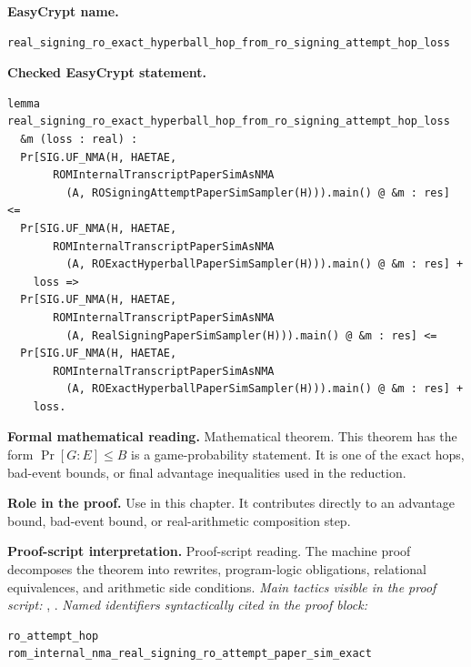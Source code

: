 \begin{formaltheorem}
\noindent\textbf{EasyCrypt name.}
\begin{lstlisting}[language=EasyCrypt,basicstyle=\ttfamily\scriptsize]
real_signing_ro_exact_hyperball_hop_from_ro_signing_attempt_hop_loss
\end{lstlisting}
\noindent\textbf{Checked EasyCrypt statement.}
\begin{lstlisting}[language=EasyCrypt,basicstyle=\ttfamily\scriptsize]
lemma real_signing_ro_exact_hyperball_hop_from_ro_signing_attempt_hop_loss
  &m (loss : real) :
  Pr[SIG.UF_NMA(H, HAETAE,
       ROMInternalTranscriptPaperSimAsNMA
         (A, ROSigningAttemptPaperSimSampler(H))).main() @ &m : res] <=
  Pr[SIG.UF_NMA(H, HAETAE,
       ROMInternalTranscriptPaperSimAsNMA
         (A, ROExactHyperballPaperSimSampler(H))).main() @ &m : res] +
    loss =>
  Pr[SIG.UF_NMA(H, HAETAE,
       ROMInternalTranscriptPaperSimAsNMA
         (A, RealSigningPaperSimSampler(H))).main() @ &m : res] <=
  Pr[SIG.UF_NMA(H, HAETAE,
       ROMInternalTranscriptPaperSimAsNMA
         (A, ROExactHyperballPaperSimSampler(H))).main() @ &m : res] +
    loss.
\end{lstlisting}
\noindent\textbf{Formal mathematical reading.}
Mathematical theorem. This theorem has the form \(\Pr[G:E] \le B\) is a game-probability statement.  It is one of the exact hops, bad-event bounds, or final advantage inequalities used in the reduction.

\noindent\textbf{Role in the proof.}
Use in this chapter. It contributes directly to an advantage bound, bad-event bound, or real-arithmetic composition step.

\noindent\textbf{Proof-script interpretation.}
Proof-script reading. The machine proof decomposes the theorem into rewrites, program-logic obligations, relational equivalences, and arithmetic side conditions.
\emph{Main tactics visible in the proof script:} , .
\emph{Named identifiers syntactically cited in the proof block:}
\begin{lstlisting}[language=EasyCrypt,basicstyle=\ttfamily\scriptsize]
ro_attempt_hop
rom_internal_nma_real_signing_ro_attempt_paper_sim_exact
\end{lstlisting}

\end{formaltheorem}

